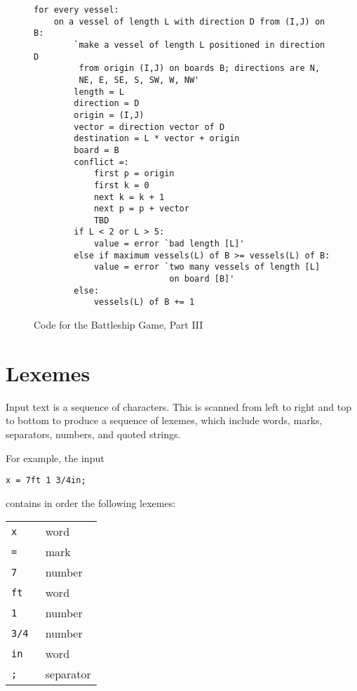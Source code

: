 \documentclass[12pt]{article}
\newlength{\figurewidth}
\newenvironment{boxedfigure}[1][!btp]%
	{\begin{figure*}[#1]
	 \begin{lrbox}{\figurebox}
	 \begin{minipage}{\figurewidth}

	 \vspace*{1ex}}%
	{
	 \vspace*{1ex}

	 \end{minipage}
	 \end{lrbox}
	 \begin{center}
	 \fbox{\hspace*{0.1in}\usebox{\figurebox}\hspace*{0.1in}}
	 \end{center}
	 \end{figure*}}
\begin{document}
\begin{boxedfigure}

\begin{verbatim}
for every vessel:
    on a vessel of length L with direction D from (I,J) on B:
        `make a vessel of length L positioned in direction D
         from origin (I,J) on boards B; directions are N,
         NE, E, SE, S, SW, W, NW'
        length = L
        direction = D
        origin = (I,J)
        vector = direction vector of D
        destination = L * vector + origin
        board = B
        conflict =:
            first p = origin
            first k = 0
            next k = k + 1
            next p = p + vector
            TBD
        if L < 2 or L > 5:
            value = error `bad length [L]'
        else if maximum vessels(L) of B >= vessels(L) of B:
            value = error `two many vessels of length [L]
                           on board [B]'
        else:
            vessels(L) of B += 1
\end{verbatim}

\caption{Code for the Battleship Game, Part III}
\label{CODE-FOR-BATTLESHIP-3}
\end{boxedfigure}

\newpage

\section{Lexemes}

Input text is a sequence of characters.  This is scanned from
left to right and top to bottom to produce a sequence of lexemes,
which include words, marks, separators, numbers, and quoted strings.

For example, the input
\begin{center}
\verb|x = 7ft 1 3/4in;|
\end{center}
contains in order the following lexemes:
\begin{center}
\begin{tabular}{ll}
\tt x	& word \\
\tt =	& mark \\
\tt 7	& number \\
\tt ft	& word \\
\tt 1	& number \\
\tt 3/4	& number \\
\tt in	& word \\
\tt ;	& separator \\
\end{tabular}
\end{center}
\end{document}
